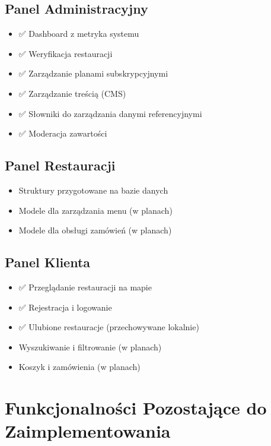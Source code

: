 ﻿\documentclass[12pt,a4paper,utf-8]{article}
\begin{document}
\subsection{Panel Administracyjny}

\begin{itemize}
    \item ✅ Dashboard z metryka systemu
    \item ✅ Weryfikacja restauracji
    \item ✅ Zarządzanie planami subskrypcyjnymi
    \item ✅ Zarządzanie treścią (CMS)
    \item ✅ Słowniki do zarządzania danymi referencyjnymi
    \item ✅ Moderacja zawartości
\end{itemize}

\subsection{Panel Restauracji}

\begin{itemize}
    \item Struktury przygotowane na bazie danych
    \item Modele dla zarządzania menu (w planach)
    \item Modele dla obsługi zamówień (w planach)
\end{itemize}

\subsection{Panel Klienta}

\begin{itemize}
    \item ✅ Przeglądanie restauracji na mapie
    \item ✅ Rejestracja i logowanie
    \item ✅ Ulubione restauracje (przechowywane lokalnie)
    \item Wyszukiwanie i filtrowanie (w planach)
    \item Koszyk i zamówienia (w planach)
\end{itemize}

\section{Funkcjonalności Pozostające do Zaimplementowania}
\end{document}
